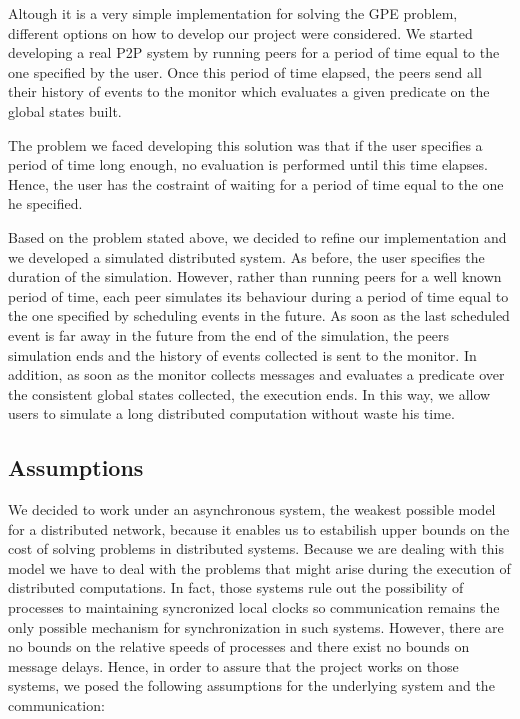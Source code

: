 \documentclass[10pt]{article}
\begin{document}
Altough it is a very simple implementation for solving the GPE problem, different options on how to develop our project were considered. We started developing a real P2P system by running peers for a period of time equal to the one specified by the user. Once this period of time elapsed, the peers send all their history of events to the monitor which evaluates a given predicate on the global states built.

The problem we faced developing this solution was that if the user specifies a period of time long enough, no evaluation is performed until this time elapses. Hence, the user has the costraint of waiting for a period of time equal to the one he specified.

Based on the problem stated above, we decided to refine our implementation and we developed a simulated distributed system. As before, the user specifies the duration of the simulation. However, rather than running peers for a well known period of time, each peer simulates its behaviour during a period of time equal to the one specified by scheduling events in the future. As soon as the last scheduled event is far away in the future from the end of the simulation, the peers simulation ends and the history of events collected is sent to the monitor. In addition, as soon as the monitor collects messages and evaluates a predicate over the consistent global states collected, the execution ends. In this way, we allow users to simulate a long distributed computation without waste his time.

\subsection{Assumptions}

We decided to work under an asynchronous system, the weakest possible model for a distributed network, because it enables us to estabilish upper bounds on the cost of solving problems in distributed systems\cite{Babaoglu}. Because we are dealing with this model we have to deal with the problems that might arise during the execution of distributed computations. In fact, those systems rule out the possibility of processes to maintaining syncronized local clocks so communication remains the only possible mechanism for synchronization in such systems. However, there are no bounds on the relative speeds of processes and there exist no bounds on message delays. Hence, in order to assure that the project works on those systems, we posed the following assumptions for the underlying system and the communication:
\end{document}

